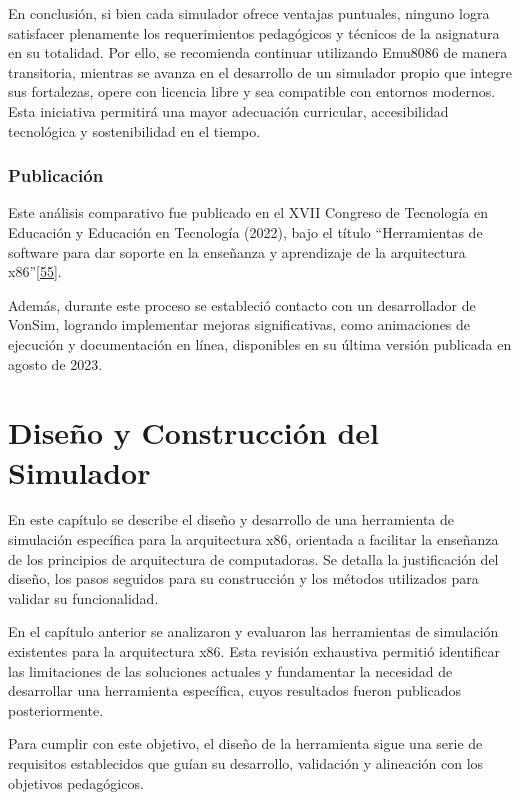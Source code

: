 \documentclass[12pt,oneside]{templates/unerthesis}
\begin{document}
En conclusión, si bien cada simulador ofrece ventajas puntuales, ninguno logra satisfacer plenamente los requerimientos pedagógicos y técnicos de la asignatura en su totalidad. Por ello, se recomienda continuar utilizando Emu8086 de manera transitoria, mientras se avanza en el desarrollo de un simulador propio que integre sus fortalezas, opere con licencia libre y sea compatible con entornos modernos. Esta iniciativa permitirá una mayor adecuación curricular, accesibilidad tecnológica y sostenibilidad en el tiempo.

\hypertarget{publicaciuxf3n}{%
\subsection{Publicación}\label{publicaciuxf3n}}

Este análisis comparativo fue publicado en el XVII Congreso de Tecnología en Educación y Educación en Tecnología (2022), bajo el título ``Herramientas de software para dar soporte en la enseñanza y aprendizaje de la arquitectura x86''\protect\hyperlink{ref-colombani_herramientas_2022}{{[}55{]}}.

Además, durante este proceso se estableció contacto con un desarrollador de VonSim, logrando implementar mejoras significativas, como animaciones de ejecución y documentación en línea, disponibles en su última versión publicada en agosto de 2023.

\hypertarget{desarrollo}{%
\chapter{Diseño y Construcción del Simulador}\label{desarrollo}}

En este capítulo se describe el diseño y desarrollo de una herramienta de simulación específica para la arquitectura x86, orientada a facilitar la enseñanza de los principios de arquitectura de computadoras. Se detalla la justificación del diseño, los pasos seguidos para su construcción y los métodos utilizados para validar su funcionalidad.

En el capítulo anterior se analizaron y evaluaron las herramientas de simulación existentes para la arquitectura x86. Esta revisión exhaustiva permitió identificar las limitaciones de las soluciones actuales y fundamentar la necesidad de desarrollar una herramienta específica, cuyos resultados fueron publicados posteriormente.

Para cumplir con este objetivo, el diseño de la herramienta sigue una serie de requisitos establecidos que guían su desarrollo, validación y alineación con los objetivos pedagógicos.
\end{document}
